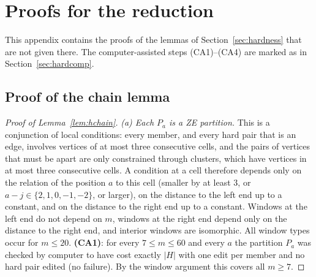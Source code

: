 \section{Proofs for the reduction}\label{app:hardness}
This appendix contains the proofs of the lemmas of Section~\ref{sec:hardness} that are not given there. The computer-assisted steps (CA1)--(CA4) are marked as in Section~\ref{sec:hardcomp}.

\subsection{Proof of the chain lemma}
\begin{proof}[Proof of Lemma~\ref{lem:hchain}]
\emph{(a) Each $P_a$ is a ZE partition.} This is a conjunction of local conditions: every member, and every hard pair that is an edge, involves vertices of at most three consecutive cells, and the pairs of vertices that must be apart are only constrained through clusters, which have vertices in at most three consecutive cells. A condition at a cell therefore depends only on the relation of the position $a$ to this cell (smaller by at least $3$, or $a-j\in\{2,1,0,-1,-2\}$, or larger), on the distance to the left end up to a constant, and on the distance to the right end up to a constant. Windows at the left end do not depend on $m$, windows at the right end depend only on the distance to the right end, and interior windows are isomorphic. All window types occur for $m\le 20$. \textbf{(CA1)}: for every $7\le m\le60$ and every $a$ the partition $P_a$ was checked by computer to have cost exactly $|H|$ with one edit per member and no hard pair edited (no failure). By the window argument this covers all $m\ge7$.


\end{proof}
